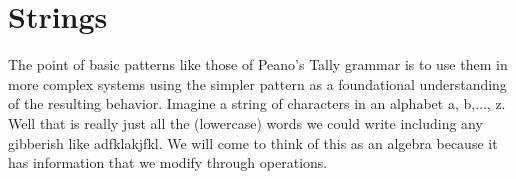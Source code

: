 \chapter{Strings}
The point of basic patterns like those of Peano's Tally grammar is to use them
in more complex systems using the simpler pattern as a foundational
understanding of the resulting behavior. Imagine a string of characters in an
alphabet a, b,$\ldots$, z.  Well that is really just all the (lowercase) words
we could write including any gibberish like adfklakjfkl.  We will come to think
of this as an algebra because it has information that we modify through operations.
